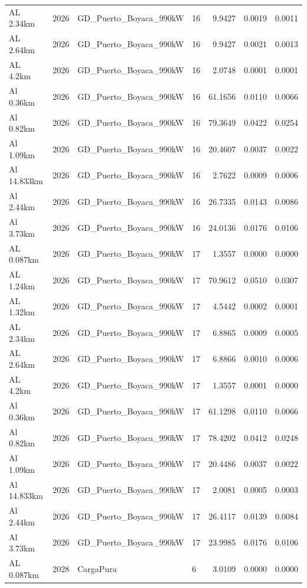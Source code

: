\documentclass[11pt,a4paper]{article}
\begin{document}
\begin{longtable}{llllrrr}
AL 2.34km & 2026 & GD\_Puerto\_Boyaca\_990kW & 16 & 9.9427 & 0.0019 & 0.0011 \\
AL 2.64km & 2026 & GD\_Puerto\_Boyaca\_990kW & 16 & 9.9427 & 0.0021 & 0.0013 \\
AL 4.2km & 2026 & GD\_Puerto\_Boyaca\_990kW & 16 & 2.0748 & 0.0001 & 0.0001 \\
Al 0.36km & 2026 & GD\_Puerto\_Boyaca\_990kW & 16 & 61.1656 & 0.0110 & 0.0066 \\
Al 0.82km & 2026 & GD\_Puerto\_Boyaca\_990kW & 16 & 79.3649 & 0.0422 & 0.0254 \\
Al 1.09km & 2026 & GD\_Puerto\_Boyaca\_990kW & 16 & 20.4607 & 0.0037 & 0.0022 \\
Al 14.833km & 2026 & GD\_Puerto\_Boyaca\_990kW & 16 & 2.7622 & 0.0009 & 0.0006 \\
Al 2.44km & 2026 & GD\_Puerto\_Boyaca\_990kW & 16 & 26.7335 & 0.0143 & 0.0086 \\
Al 3.73km & 2026 & GD\_Puerto\_Boyaca\_990kW & 16 & 24.0136 & 0.0176 & 0.0106 \\
AL 0.087km & 2026 & GD\_Puerto\_Boyaca\_990kW & 17 & 1.3557 & 0.0000 & 0.0000 \\
AL 1.24km & 2026 & GD\_Puerto\_Boyaca\_990kW & 17 & 70.9612 & 0.0510 & 0.0307 \\
AL 1.32km & 2026 & GD\_Puerto\_Boyaca\_990kW & 17 & 4.5442 & 0.0002 & 0.0001 \\
AL 2.34km & 2026 & GD\_Puerto\_Boyaca\_990kW & 17 & 6.8865 & 0.0009 & 0.0005 \\
AL 2.64km & 2026 & GD\_Puerto\_Boyaca\_990kW & 17 & 6.8866 & 0.0010 & 0.0006 \\
AL 4.2km & 2026 & GD\_Puerto\_Boyaca\_990kW & 17 & 1.3557 & 0.0001 & 0.0000 \\
Al 0.36km & 2026 & GD\_Puerto\_Boyaca\_990kW & 17 & 61.1298 & 0.0110 & 0.0066 \\
Al 0.82km & 2026 & GD\_Puerto\_Boyaca\_990kW & 17 & 78.4202 & 0.0412 & 0.0248 \\
Al 1.09km & 2026 & GD\_Puerto\_Boyaca\_990kW & 17 & 20.4486 & 0.0037 & 0.0022 \\
Al 14.833km & 2026 & GD\_Puerto\_Boyaca\_990kW & 17 & 2.0081 & 0.0005 & 0.0003 \\
Al 2.44km & 2026 & GD\_Puerto\_Boyaca\_990kW & 17 & 26.4117 & 0.0139 & 0.0084 \\
Al 3.73km & 2026 & GD\_Puerto\_Boyaca\_990kW & 17 & 23.9985 & 0.0176 & 0.0106 \\
AL 0.087km & 2028 & CargaPura & 6 & 3.0109 & 0.0000 & 0.0000 \\

\end{longtable}
\end{document}
